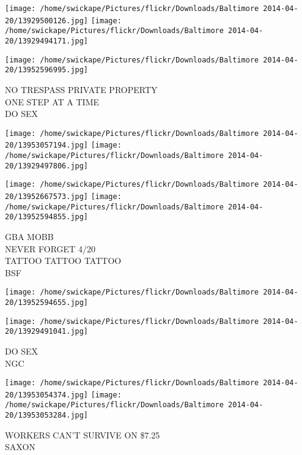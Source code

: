 \documentclass[10pt,letterpaper]{article}
\begin{document}
\texttt{[image: /home/swickape/Pictures/flickr/Downloads/Baltimore 2014-04-20/13929500126.jpg]}
\texttt{[image: /home/swickape/Pictures/flickr/Downloads/Baltimore 2014-04-20/13929494171.jpg]}

\vspace{0.25in}
\texttt{[image: /home/swickape/Pictures/flickr/Downloads/Baltimore 2014-04-20/13952596995.jpg]}

NO TRESPASS PRIVATE PROPERTY\\
ONE STEP AT A TIME\\
DO SEX
\pagebreak

\texttt{[image: /home/swickape/Pictures/flickr/Downloads/Baltimore 2014-04-20/13953057194.jpg]}
\texttt{[image: /home/swickape/Pictures/flickr/Downloads/Baltimore 2014-04-20/13929497806.jpg]}

\texttt{[image: /home/swickape/Pictures/flickr/Downloads/Baltimore 2014-04-20/13952667573.jpg]}
\texttt{[image: /home/swickape/Pictures/flickr/Downloads/Baltimore 2014-04-20/13952594855.jpg]}

GBA MOBB\\
NEVER FORGET 4/20\\
TATTOO TATTOO TATTOO\\
BSF
\pagebreak

\texttt{[image: /home/swickape/Pictures/flickr/Downloads/Baltimore 2014-04-20/13952594655.jpg]}

\vspace{0.25in}
\texttt{[image: /home/swickape/Pictures/flickr/Downloads/Baltimore 2014-04-20/13929491041.jpg]}

DO SEX\\
NGC
\pagebreak

\texttt{[image: /home/swickape/Pictures/flickr/Downloads/Baltimore 2014-04-20/13953054374.jpg]}
\texttt{[image: /home/swickape/Pictures/flickr/Downloads/Baltimore 2014-04-20/13953053284.jpg]}

WORKERS CAN'T SURVIVE ON \$7.25\\
SAXON
\pagebreak
\end{document}
